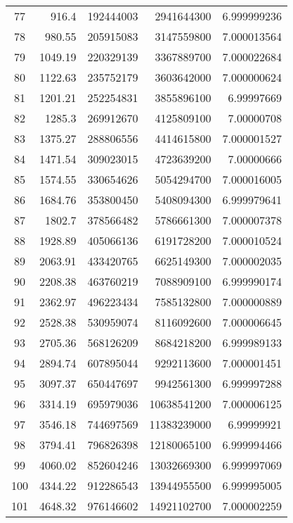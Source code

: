 \documentclass{article}      %
\begin{document}
\begin{appendix}
\begin{center}
\begin{tabular}{ |c|r|r|r|r| }
 77 & 916.4 & 192444003 & 2941644300 & 6.999999236 \\
 78 & 980.55 & 205915083 & 3147559800 & 7.000013564 \\
 79 & 1049.19 & 220329139 & 3367889700 & 7.000022684 \\
 80 & 1122.63 & 235752179 & 3603642000 & 7.000000624 \\
 81 & 1201.21 & 252254831 & 3855896100 & 6.99997669 \\
 82 & 1285.3 & 269912670 & 4125809100 & 7.00000708 \\
 83 & 1375.27 & 288806556 & 4414615800 & 7.000001527 \\
 84 & 1471.54 & 309023015 & 4723639200 & 7.00000666 \\
 85 & 1574.55 & 330654626 & 5054294700 & 7.000016005 \\
 86 & 1684.76 & 353800450 & 5408094300 & 6.999979641 \\
 87 & 1802.7 & 378566482 & 5786661300 & 7.000007378 \\
 88 & 1928.89 & 405066136 & 6191728200 & 7.000010524 \\
 89 & 2063.91 & 433420765 & 6625149300 & 7.000002035 \\
 90 & 2208.38 & 463760219 & 7088909100 & 6.999990174 \\
 91 & 2362.97 & 496223434 & 7585132800 & 7.000000889 \\
 92 & 2528.38 & 530959074 & 8116092600 & 7.000006645 \\
 93 & 2705.36 & 568126209 & 8684218200 & 6.999989133 \\
 94 & 2894.74 & 607895044 & 9292113600 & 7.000001451 \\
 95 & 3097.37 & 650447697 & 9942561300 & 6.999997288 \\
 96 & 3314.19 & 695979036 & 10638541200 & 7.000006125 \\
 97 & 3546.18 & 744697569 & 11383239000 & 6.99999921 \\
 98 & 3794.41 & 796826398 & 12180065100 & 6.999994466 \\
 99 & 4060.02 & 852604246 & 13032669300 & 6.999997069 \\
 100 & 4344.22 & 912286543 & 13944955500 & 6.999995005 \\
 101 & 4648.32 & 976146602 & 14921102700 & 7.000002259 \\
 \hline
\end{tabular}
\end{center}

\end{appendix}
\end{document}
